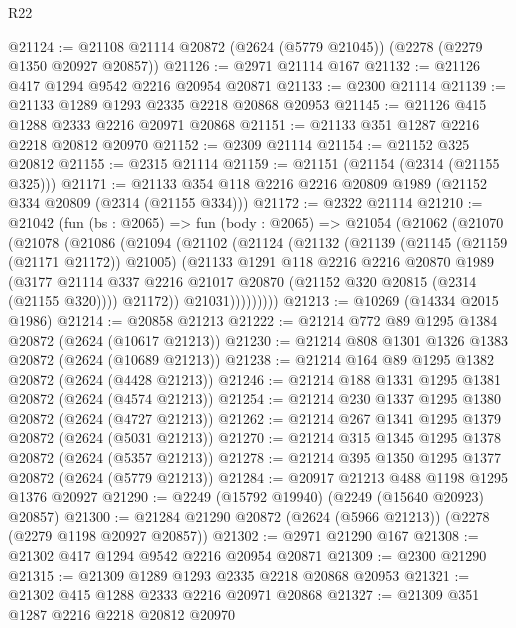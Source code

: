 \begin{lexlean}{R22}
\begin{coremodule}
@21124 := @21108 @21114 @20872 (@2624 (@5779 @21045)) (@2278 (@2279 @1350 @20927 @20857))
@21126 := @2971 @21114 @167
@21132 := @21126 @417 @1294 @9542 @2216 @20954 @20871
@21133 := @2300 @21114
@21139 := @21133 @1289 @1293 @2335 @2218 @20868 @20953
@21145 := @21126 @415 @1288 @2333 @2216 @20971 @20868
@21151 := @21133 @351 @1287 @2216 @2218 @20812 @20970
@21152 := @2309 @21114
@21154 := @21152 @325 @20812
@21155 := @2315 @21114
@21159 := @21151 (@21154 (@2314 (@21155 @325)))
@21171 := @21133 @354 @118 @2216 @2216 @20809 @1989 (@21152 @334 @20809 (@2314 (@21155 @334)))
@21172 := @2322 @21114
@21210 := @21042
    (fun (bs : @2065) =>
    fun (body : @2065) =>
    @21054
      (@21062
        (@21070
          (@21078
            (@21086
              (@21094
                (@21102
                  (@21124
                    (@21132
                      (@21139
                        (@21145 (@21159 (@21171 @21172)) @21005)
                        (@21133
                          @1291
                          @118
                          @2216
                          @2216
                          @20870
                          @1989
                          (@3177
                            @21114
                            @337
                            @2216
                            @21017
                            @20870
                            (@21152 @320 @20815 (@2314 (@21155 @320))))
                          @21172))
                      @21031)))))))))
@21213 := @10269 (@14334 @2015 @1986)
@21214 := @20858 @21213
@21222 := @21214 @772 @89 @1295 @1384 @20872 (@2624 (@10617 @21213))
@21230 := @21214 @808 @1301 @1326 @1383 @20872 (@2624 (@10689 @21213))
@21238 := @21214 @164 @89 @1295 @1382 @20872 (@2624 (@4428 @21213))
@21246 := @21214 @188 @1331 @1295 @1381 @20872 (@2624 (@4574 @21213))
@21254 := @21214 @230 @1337 @1295 @1380 @20872 (@2624 (@4727 @21213))
@21262 := @21214 @267 @1341 @1295 @1379 @20872 (@2624 (@5031 @21213))
@21270 := @21214 @315 @1345 @1295 @1378 @20872 (@2624 (@5357 @21213))
@21278 := @21214 @395 @1350 @1295 @1377 @20872 (@2624 (@5779 @21213))
@21284 := @20917 @21213 @488 @1198 @1295 @1376 @20927
@21290 := @2249 (@15792 @19940) (@2249 (@15640 @20923) @20857)
@21300 := @21284 @21290 @20872 (@2624 (@5966 @21213)) (@2278 (@2279 @1198 @20927 @20857))
@21302 := @2971 @21290 @167
@21308 := @21302 @417 @1294 @9542 @2216 @20954 @20871
@21309 := @2300 @21290
@21315 := @21309 @1289 @1293 @2335 @2218 @20868 @20953
@21321 := @21302 @415 @1288 @2333 @2216 @20971 @20868
@21327 := @21309 @351 @1287 @2216 @2218 @20812 @20970

\end{coremodule}
\end{lexlean}
